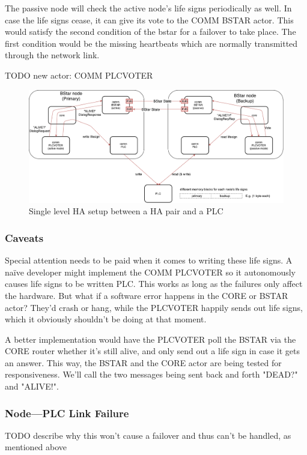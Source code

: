 The passive node will check the active node's life signs periodically as well.
In case the life signs cease, it can give its vote to the COMM BSTAR actor.
This would satisfy the second condition of the \gls{bstar} for a
failover to take place. The first condition would be the missing heartbeats
which are normally transmitted through the network link.

TODO new actor: COMM PLCVOTER\\

\begin{figure}[!ht]
	\includegraphics[width=\textwidth]{img/SL-HA_bstar.pdf}
	\caption{Single level HA setup between a HA pair and a PLC}
	\label{fig:sl-ha}
\end{figure}

\subsubsection{Caveats}
Special attention needs to be paid when it comes to writing these life signs. A
na\"ive developer might implement the COMM PLCVOTER so it autonomously causes
life signs to be written PLC. This works as long as the failures only affect
the hardware. But what if a software error happens in the CORE or BSTAR actor?
They'd crash or hang, while the PLCVOTER happily sends out life signs, which it
obviously shouldn't be doing at that moment.

A better implementation would have the PLCVOTER poll the BSTAR via the CORE
router whether it's still alive, and only send out a life sign in case it gets
an answer. This way, the BSTAR and the CORE actor are being tested for
responsiveness. We'll call the two messages being sent back and forth "DEAD?"
and "ALIVE!".

\subsubsection{Node---PLC Link Failure}
TODO describe why this won't cause a failover and thus can't be handled, as
mentioned above\\

